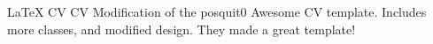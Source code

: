 \begin{cvprojects}
    \cvproject
        {LaTeX CV}
        {CV} %
        {Modification of the posquit0 Awesome CV template. Includes more classes, and modified design. They made a great template!}
\end{cvprojects}
